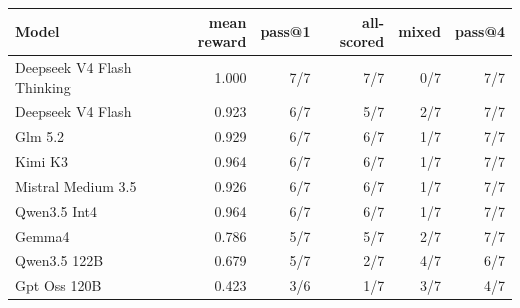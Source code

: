 \begin{tabular}{lrrrrr}
\toprule
Model & mean reward & pass@1 & all-scored & mixed & pass@4 \\
\midrule
Deepseek V4 Flash Thinking & 1.000 & 7/7 & 7/7 & 0/7 & 7/7 \\
Deepseek V4 Flash & 0.923 & 6/7 & 5/7 & 2/7 & 7/7 \\
Glm 5.2 & 0.929 & 6/7 & 6/7 & 1/7 & 7/7 \\
Kimi K3 & 0.964 & 6/7 & 6/7 & 1/7 & 7/7 \\
Mistral Medium 3.5 & 0.926 & 6/7 & 6/7 & 1/7 & 7/7 \\
Qwen3.5 Int4 & 0.964 & 6/7 & 6/7 & 1/7 & 7/7 \\
Gemma4 & 0.786 & 5/7 & 5/7 & 2/7 & 7/7 \\
Qwen3.5 122B & 0.679 & 5/7 & 2/7 & 4/7 & 6/7 \\
Gpt Oss 120B & 0.423 & 3/6 & 1/7 & 3/7 & 4/7 \\
\bottomrule
\end{tabular}
